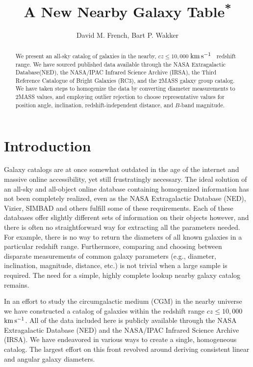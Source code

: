 \documentclass[iop]{emulateapj-rtx4}
\newcommand{\kms}{$\rm km\, s^{-1}$}
\begin{document}
\title{A New Nearby Galaxy Table\textsuperscript{*}}

\author{David M. French, Bart P. Wakker}



\begin{abstract}

We present an all-sky catalog of galaxies in the nearby, $cz \leq 10,000$ \kms~ redshift range. We have sourced published data available through the NASA Extragalactic Database(NED), the NASA/IPAC Infrared Science Archive (IRSA), the Third Reference Catalogue of Bright Galaxies (RC3), and the \cite{tully2015} 2MASS galaxy group catalog. We have taken steps to homogenize the data by converting diameter measurements to 2MASS values, and employing outlier rejection to choose representative values for position angle, inclination, redshift-independent distance, and $B$-band magnitude. 



\end{abstract}


\section{Introduction}


Galaxy catalogs are at once somewhat outdated in the age of the internet and massive online accessibility, yet still frustratingly necessary. The ideal solution of an all-sky and all-object online database containing homogenized information has not been completely realized, even as the NASA Extragalactic Database (NED), Vizier, SIMBAD and others fulfill some of these requirements. Each of these databases offer slightly different sets of information on their objects however, and there is often no straightforward way for extracting all the parameters needed. For example, there is no way to return the diameters of all known galaxies in a particular redshift range. Furthermore, comparing and choosing between disparate measurements of common galaxy parameters (e.g., diameter, inclination, magnitude, distance, etc.) is not trivial when a large sample is required. The need for a simple, highly complete lookup nearby galaxy catalog remains.


In an effort to study the circumgalactic medium (CGM) in the nearby universe we have constructed a catalog of galaxies within the redshift range $cz \leq 10,000$ \kms. All of the data included here is publicly available through the NASA Extragalactic Database (NED) and the NASA/IPAC Infrared Science Archive (IRSA). We have endeavored in various ways to create a single, homogeneous catalog. The largest effort on this front revolved around deriving consistent linear and angular galaxy diameters. 
\end{document}
